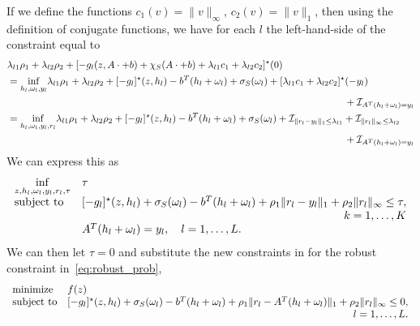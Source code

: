 If we define the functions $c_1(v) = \|v\|_\infty$, $c_2(v) = \|v\|_1$, then using the definition of conjugate functions, we have for each $l$ the left-hand-side of the constraint equal to
\begin{equation*}
\begin{aligned}
		& \lambda_{l1}\rho_1 +  \lambda_{l2}\rho_2 +  [-g_l(z,A\cdot+b) +\chi_S(A\cdot+b) + \lambda_{l1} c_1 + \lambda_{l2} c_2]^\star(0)\\
		&= 	\underset{h_l,\omega_l, y_l}{\inf} \lambda_{l1}\rho_1 + \lambda_{l2}\rho_2 + [-g_l]^\star(z,h_l) - b^T(h_l + \omega_l) + \sigma_S(\omega_l)  +  [\lambda_{l1} c_1 + \lambda_{l2} c_2 ]^\star(-y_l) \\
  &\hspace{12cm}+ \indicator_{A^T(h_l + \omega_l) = y_l} \\
		&= \underset{h_l,\omega_l, y_l, r_l}{\inf} \lambda_{l1}\rho_1 + \lambda_{l2}\rho_2 + [-g_l]^\star(z,h_l) - b^T(h_l + \omega_l)+ \sigma_S(\omega_l)  + \indicator_{\|r_l-y_l\|_1 \leq \lambda_{l1}} + \indicator_{\|r_l\|_\infty \leq \lambda_{l2}} \\
  & \hspace{12cm} + \indicator_{A^T(h_l + \omega_l) = y_l}
\end{aligned}
\end{equation*}
We can express this as
\begin{equation*}
	\begin{aligned}
	\begin{array}[t]{ll}
		\underset{z, h_l,\omega_l, y_l, r_l, \tau}{\inf} & \tau \\
		\mbox{subject to} & [-g_l]^\star(z,h_l)  + \sigma_S(\omega_l) -  b^T(h_l + \omega_l) + \rho_1\|r_l - y_l\|_1  + \rho_2\|r_l\|_\infty \leq \tau, \\
  &\hfill k =  1, \dots,K \\
	 & A^T(h_l + \omega_l) = y_l,  \quad l =  1, \dots,L.
	\end{array}
	\end{aligned}
	\end{equation*}
 We can then let $\tau = 0$ and substitute the new constraints in for the robust constraint in~\eqref{eq:robust_prob},
\begin{equation*}
	\begin{array}[t]{ll}
		{\text{minimize}} & f(z) \\
		\mbox{subject to} & [-g_l]^\star(z,h_l)  + \sigma_S(\omega_l) -  b^T(h_l + \omega_l) + \rho_1\|r_l - A^T(h_l + \omega_l)\|_1  + \rho_2\|r_l\|_\infty \leq 0,\\
  &\hfill l =  1, \dots,L.	\end{array}
	\end{equation*}

